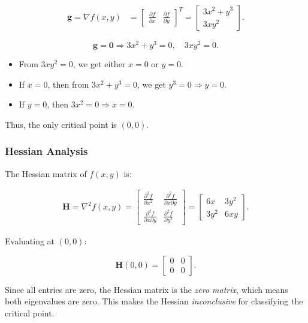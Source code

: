 \documentclass[12pt]{article}
\begin{document}
\begin{align*}
\mathbf{g} = \nabla f(x, y) &= 
\begin{bmatrix} 
\frac{\partial f}{\partial x} & \frac{\partial f}{\partial y} 
\end{bmatrix}^T 
= \begin{bmatrix} 3x^2 + y^3 \\ 3x y^2 \end{bmatrix}.
\end{align*}

\[
\mathbf{g} = \mathbf{0} \Rightarrow 3x^2 + y^3 = 0, \quad 3x y^2 = 0.
\]

\begin{itemize}
    \item From \( 3x y^2 = 0 \), we get either \( x = 0 \) or \( y = 0 \).
    \item If \( x = 0 \), then from \( 3x^2 + y^3 = 0 \), we get \( y^3 = 0 \Rightarrow y = 0 \).
    \item If \( y = 0 \), then \( 3x^2 = 0 \Rightarrow x = 0 \).
\end{itemize}

Thus, the only critical point is \( (0,0) \).

\subsubsection{Hessian Analysis}

The Hessian matrix of \( f(x, y) \) is:

\begin{align*}
\mathbf{H} = \nabla^2 f(x,y) = 
\begin{bmatrix}
\frac{\partial^2 f}{\partial x^2} & \frac{\partial^2 f}{\partial x \partial y} \\
\frac{\partial^2 f}{\partial x \partial y} & \frac{\partial^2 f}{\partial y^2}
\end{bmatrix}
=
\begin{bmatrix}
6x & 3y^2 \\
3y^2 & 6xy
\end{bmatrix}.
\end{align*}

Evaluating at \( (0,0) \):

\[
\mathbf{H}(0,0) = 
\begin{bmatrix}
0 & 0 \\
0 & 0
\end{bmatrix}.
\]

Since all entries are zero, the Hessian matrix is the \textit{zero matrix}, which means both eigenvalues are zero. This makes the Hessian \textit{inconclusive} for classifying the critical point.
\end{document}
